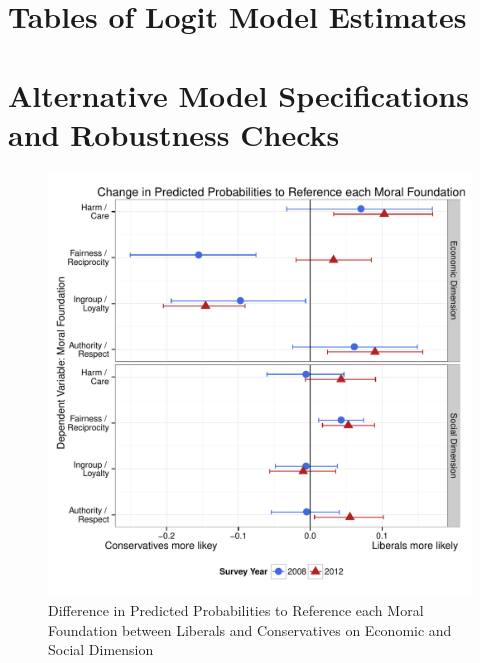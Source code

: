 \documentclass[12pt]{article}
\begin{document}
\clearpage
\section{Tables of Logit Model Estimates}\label{app:models}
\renewcommand\thefigure{\thesection.\arabic{figure}}
\renewcommand\thetable{\thesection.\arabic{table}}
\setcounter{figure}{0}
\setcounter{table}{0}






\clearpage
\section{Alternative Model Specifications and Robustness Checks}\label{app:robust}
\renewcommand\thefigure{\thesection.\arabic{figure}}
\renewcommand\thetable{\thesection.\arabic{table}}
\setcounter{figure}{0}
\setcounter{table}{0}

\begin{figure}[ht]\centering
\includegraphics[scale=.4]{../calc/fig/m1b_mft.pdf}
\caption{Difference in Predicted Probabilities to Reference each Moral Foundation between Liberals and Conservatives on Economic and Social Dimension}\label{fig:m1b_mft}
\end{figure}
\end{document}
